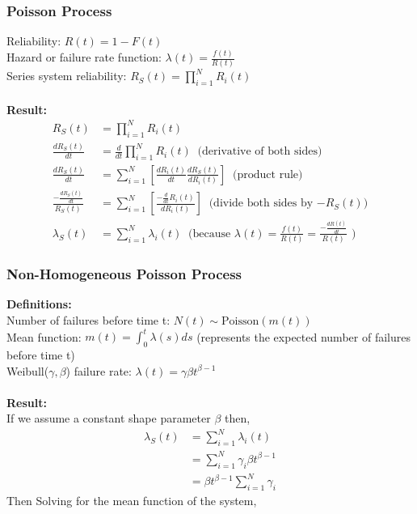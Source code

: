 \documentclass[12pt]{article}
\begin{document}
\subsubsection{Poisson Process}

Reliability: $R(t) = 1 - F(t)$ \\
Hazard or failure rate function: $\lambda(t) = \frac{f(t)}{R(t)}$ \\
Series system reliability: $R_S(t) = \prod_{i = 1}^N R_i(t)$
\\
\\
\textbf{Result:}
$$
\begin{aligned}
	R_S(t) &= \prod_{i = 1}^N R_i(t) \\
	\frac{dR_S(t)}{dt} &= \frac{d}{dt} \prod_{i = 1}^N R_i(t) \; \; \text{(derivative of both sides)} \\
	\frac{dR_S(t)}{dt} &= \sum_{i=1}^N \left[ \frac{dR_i(t)}{dt} \frac{dR_S(t)}{dR_i(t)} \right] \; \; \text{(product rule)} \\
    \frac{-\frac{dR_S(t)}{dt}}{R_S(t)} &= \sum_{i=1}^N \left[  \frac{-\frac{d}{dt}R_i(t)}{dR_i(t)} \right] \; \; \text{(divide both sides by $-R_S(t)$)} \\
    \lambda_S(t) &= \sum_{i = 1}^N \lambda_i(t) \; \; \text{(because $\lambda(t) = \frac{f(t)}{R(t)} = \frac{-\frac{dR(t)}{dt}}{R(t)}$ )}
\end{aligned}
$$

\subsubsection{Non-Homogeneous Poisson Process}

\textbf{Definitions:} \\
\noindent
Number of failures before time t: $N(t) \sim \text{Poisson}(m(t))$ \\
Mean function: $m(t) = \int_0^t \lambda(s)ds$ (represents the expected number of failures before time t) \\
Weibull($\gamma, \beta $) failure rate: $\lambda(t) = \gamma\beta t^{\beta - 1}$
\\
\\
\textbf{Result:}\\
If we assume a constant shape parameter $\beta$ then,\\
$$
\begin{aligned}
	\lambda_S(t) &= \sum_{i = 1}^N \lambda_i(t) \\
    &= \sum_{i = 1}^N \gamma_i\beta t^{\beta - 1} \\
    &= \beta t^{\beta -1} \sum_{i = 1}^N \gamma_i
\end{aligned}
$$
\newpage
Then Solving for the mean function of the system,
\end{document}
